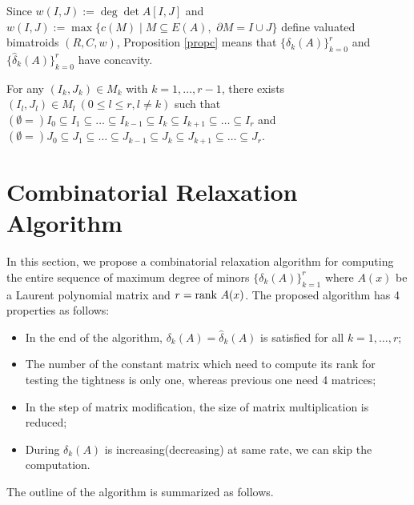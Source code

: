Since $ w(I,J) := \deg \det A[I,J] $ and $ w (I,J) := \max \{ c(M) \mid M \subseteq E(A) ,$ 
$\partial M = I \cup J \}$ define valuated bimatroids $ (R,C,w) $, 
Proposition \ref{propc} means that $ \{ \delta_k (A) \}_{k=0}^r $ 
and $ \{ \hat{\delta}_k (A) \}_{k=0}^r $ have concavity. 

\begin{proposition}
For any $(I_k ,J_k) \in M_k $ with $ k = 1, \dots ,r-1 $, 
there exists $(I_l,J_l) \in M_l \ ( 0 \le l \le r , l \neq k ) $ such that 
$ ( \emptyset = ) I_0 \subseteq I_1 \subseteq \dots \subseteq I_{k-1} \subseteq I_k \subseteq I_{k+1} \subseteq \dots \subseteq I_r $ 
and 
$ ( \emptyset = ) J_0 \subseteq J_1 \subseteq \dots \subseteq J_{k-1} \subseteq J_k \subseteq J_{k+1} \subseteq \dots \subseteq J_r $.
\label{propn}
\end{proposition}











\section{Combinatorial Relaxation Algorithm}
\label{cra}
In this section, 
we propose a combinatorial relaxation algorithm 
for computing the entire sequence of maximum degree of minors $\{ \delta_k (A) \}_{k=1}^r$ 
where $ A(x) $ be a Laurent polynomial matrix and $ r = \mathrm{rank} \  A(x) $.
The proposed algorithm has 4 properties as follows:
\begin{itemize}
\item In the end of the algorithm, $ \delta_k (A) = \hat{\delta}_k (A) $ is satisfied for all $k = 1 , \dots ,r $;
\item The number of the constant matrix which need to compute its rank for testing the tightness is only one, whereas previous one need 4 matrices;
\item In the step of matrix modification, the size of matrix multiplication is reduced;
\item During $ \delta_k (A) $ is increasing(decreasing) at same rate, we can skip the computation.
\end{itemize}

The outline of the algorithm is summarized as follows.

